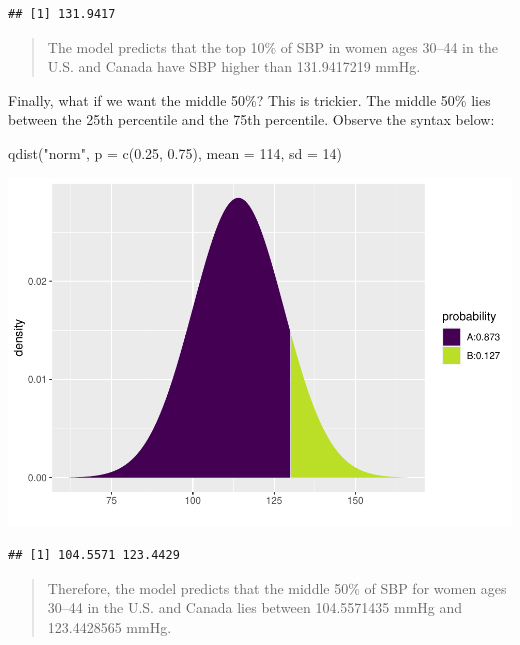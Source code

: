 \documentclass[
]{book}
\newenvironment{Shaded}{\begin{snugshade}}{\end{snugshade}}
\newcommand{\AttributeTok}[1]{\textcolor[rgb]{0.77,0.63,0.00}{#1}}
\newcommand{\DecValTok}[1]{\textcolor[rgb]{0.00,0.00,0.81}{#1}}
\newcommand{\FloatTok}[1]{\textcolor[rgb]{0.00,0.00,0.81}{#1}}
\newcommand{\FunctionTok}[1]{\textcolor[rgb]{0.00,0.00,0.00}{#1}}
\newcommand{\NormalTok}[1]{#1}
\newcommand{\StringTok}[1]{\textcolor[rgb]{0.31,0.60,0.02}{#1}}
\begin{document}
\begin{verbatim}
## [1] 131.9417
\end{verbatim}

\begin{quote}
The model predicts that the top 10\% of SBP in women ages 30--44 in the U.S. and Canada have SBP higher than 131.9417219 mmHg.
\end{quote}

Finally, what if we want the middle 50\%? This is trickier. The middle 50\% lies between the 25th percentile and the 75th percentile. Observe the syntax below:

\begin{Shaded}
\begin{Highlighting}[]
\FunctionTok{qdist}\NormalTok{(}\StringTok{"norm"}\NormalTok{, }\AttributeTok{p =} \FunctionTok{c}\NormalTok{(}\FloatTok{0.25}\NormalTok{, }\FloatTok{0.75}\NormalTok{), }\AttributeTok{mean =} \DecValTok{114}\NormalTok{, }\AttributeTok{sd =} \DecValTok{14}\NormalTok{)}
\end{Highlighting}
\end{Shaded}

\includegraphics{intro_stats_files/figure-latex/unnamed-chunk-350-1.pdf}

\begin{verbatim}
## [1] 104.5571 123.4429
\end{verbatim}

\begin{quote}
Therefore, the model predicts that the middle 50\% of SBP for women ages 30--44 in the U.S. and Canada lies between 104.5571435 mmHg and 123.4428565 mmHg.
\end{quote}
\end{document}

